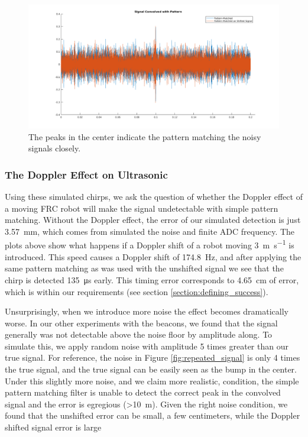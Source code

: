 \documentclass{article}
\begin{document}
    \begin{figure}
      \centering
      \includegraphics[width=1\linewidth]{./images/pattern_matching.png}
      \caption{The peaks in the center indicate the pattern matching the noisy signals closely.}
      \label{fig:pattern_matching}
    \end{figure}

    \subsubsection{The Doppler Effect on Ultrasonic}

      Using these simulated chirps, we ask the question of whether the Doppler effect of a moving FRC robot will make the signal undetectable with simple pattern matching. Without the Doppler effect, the error of our simulated detection is just \SI{3.57}{\milli\meter}, which comes from simulated the noise and finite ADC frequency. The plots above show what happens if a Doppler shift of a robot moving \SI{3}{\meter\per\second} is introduced. This speed causes a Doppler shift of \SI{174.8}{\hertz}, and after applying the same pattern matching as was used with the unshifted signal we see that the chirp is detected \SI{135}{\micro\second} early. This timing error corresponds to \SI{4.65}{\centi\meter} of error, which is within our requirements (see section \ref{section:defining_success}).

      Unsurprisingly, when we introduce more noise the effect becomes dramatically worse. In our other experiments with the beacons, we found that the signal generally was not detectable above the noise floor by amplitude along. To simulate this, we apply random noise with amplitude 5 times greater than our true signal. For reference, the noise in Figure \ref{fig:repeated_signal} is only 4 times the true signal, and the true signal can be easily seen as the bump in the center. Under this slightly more noise, and we claim more realistic, condition, the simple pattern matching filter is unable to detect the correct peak in the convolved signal and the error is egregious (>\SI{10}{\meter}). Given the right noise condition, we found that the unshifted error can be small, a few centimeters, while the Doppler shifted signal error is large
\end{document}
